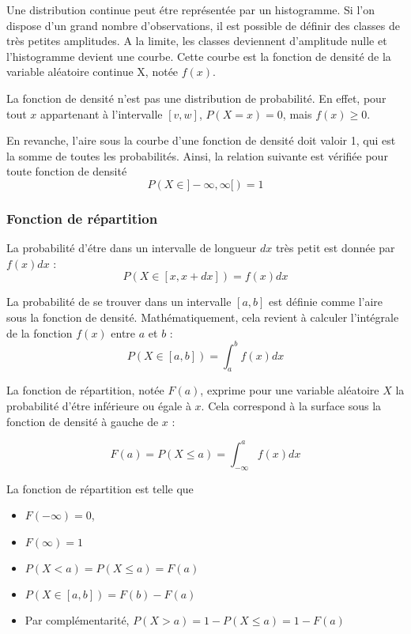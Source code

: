 Une distribution continue peut \'etre repr\'esent\'ee par un histogramme. Si l'on dispose d'un grand nombre d'observations, il est possible de d\'efinir des classes de tr\`es petites amplitudes. A la limite, les classes deviennent d'amplitude nulle et l'histogramme devient une courbe. Cette courbe est la fonction de densit\'e de la variable al\'eatoire continue X, not\'ee $f(x)$.

La fonction de densit\'e n'est pas une distribution de probabilit\'e. En effet, pour tout $x$ appartenant \`a l'intervalle $[v,w]$, $P(X = x) = 0$, mais $f(x) \geq 0$.

En revanche, l'aire sous la courbe d'une fonction de densit\'e doit valoir 1, qui est la somme de toutes les probabilit\'es. Ainsi, la relation suivante est v\'erifi\'ee pour toute fonction de densit\'e
$$P(X \in ] -\infty,\infty[) = 1$$

\subsubsection{Fonction de r\'epartition}
La probabilit\'e d'\'etre dans un intervalle de longueur $dx$ tr\`es petit est donn\'ee par $f(x) dx$ :
$$P(X \in [x, x + dx]) = f(x) dx$$

La probabilit\'e de se trouver dans un intervalle $[a, b]$ est d\'efinie comme l'aire sous la fonction de densit\'e.
Math\'ematiquement, cela revient \`a calculer l'int\'egrale de la fonction $f(x)$ entre $a$ et $b$ :
$$P(X \in [a, b]) = \int^b_a f(x) dx$$

\begin{defi}
La fonction de r\'epartition, not\'ee $F(a)$, exprime pour une variable al\'eatoire $X$ la probabilit\'e d'\'etre inf\'erieure ou \'egale \`a $x$. Cela correspond \`a la surface sous la fonction de densit\'e \`a gauche de $x$ :

$$F(a) = P(X \leq a) = \int^a_{-\infty} f(x) dx$$
\end{defi}

\begin{pro}
La fonction de r\'epartition est telle que
\begin{itemize}
	\item $F(-\infty) = 0$, 
	\item $F(\infty) = 1$
	\item $P(X <a) = P(X \leq a) = F(a)$
  \item $P(X \in [a, b]) = F(b) - F(a)$
  \item Par compl\'ementarit\'e, $P(X>a) = 1- P(X\leq a) = 1-F(a)$
\end{itemize}
\end{pro}

